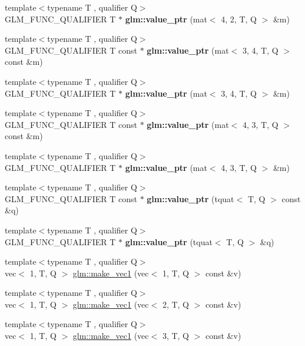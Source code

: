 \begin{DoxyCompactItemize}
\item 
{\footnotesize template$<$typename T , qualifier Q$>$ }\\G\+L\+M\+\_\+\+F\+U\+N\+C\+\_\+\+Q\+U\+A\+L\+I\+F\+I\+ER T $\ast$ {\bfseries glm\+::value\+\_\+ptr} (mat$<$ 4, 2, T, Q $>$ \&m)
\item 
{\footnotesize template$<$typename T , qualifier Q$>$ }\\G\+L\+M\+\_\+\+F\+U\+N\+C\+\_\+\+Q\+U\+A\+L\+I\+F\+I\+ER T const  $\ast$ {\bfseries glm\+::value\+\_\+ptr} (mat$<$ 3, 4, T, Q $>$ const \&m)
\item 
{\footnotesize template$<$typename T , qualifier Q$>$ }\\G\+L\+M\+\_\+\+F\+U\+N\+C\+\_\+\+Q\+U\+A\+L\+I\+F\+I\+ER T $\ast$ {\bfseries glm\+::value\+\_\+ptr} (mat$<$ 3, 4, T, Q $>$ \&m)
\item 
{\footnotesize template$<$typename T , qualifier Q$>$ }\\G\+L\+M\+\_\+\+F\+U\+N\+C\+\_\+\+Q\+U\+A\+L\+I\+F\+I\+ER T const  $\ast$ {\bfseries glm\+::value\+\_\+ptr} (mat$<$ 4, 3, T, Q $>$ const \&m)
\item 
{\footnotesize template$<$typename T , qualifier Q$>$ }\\G\+L\+M\+\_\+\+F\+U\+N\+C\+\_\+\+Q\+U\+A\+L\+I\+F\+I\+ER T $\ast$ {\bfseries glm\+::value\+\_\+ptr} (mat$<$ 4, 3, T, Q $>$ \&m)
\item 
{\footnotesize template$<$typename T , qualifier Q$>$ }\\G\+L\+M\+\_\+\+F\+U\+N\+C\+\_\+\+Q\+U\+A\+L\+I\+F\+I\+ER T const  $\ast$ {\bfseries glm\+::value\+\_\+ptr} (tquat$<$ T, Q $>$ const \&q)
\item 
{\footnotesize template$<$typename T , qualifier Q$>$ }\\G\+L\+M\+\_\+\+F\+U\+N\+C\+\_\+\+Q\+U\+A\+L\+I\+F\+I\+ER T $\ast$ {\bfseries glm\+::value\+\_\+ptr} (tquat$<$ T, Q $>$ \&q)
\item 
{\footnotesize template$<$typename T , qualifier Q$>$ }\\vec$<$ 1, T, Q $>$ \hyperlink{group__gtc__type__ptr_ga4135f03f3049f0a4eb76545c4967957c}{glm\+::make\+\_\+vec1} (vec$<$ 1, T, Q $>$ const \&v)
\item 
{\footnotesize template$<$typename T , qualifier Q$>$ }\\vec$<$ 1, T, Q $>$ \hyperlink{group__gtc__type__ptr_ga13c92b81e55f201b052a6404d57da220}{glm\+::make\+\_\+vec1} (vec$<$ 2, T, Q $>$ const \&v)
\item 
{\footnotesize template$<$typename T , qualifier Q$>$ }\\vec$<$ 1, T, Q $>$ \hyperlink{group__gtc__type__ptr_ga3c23cc74086d361e22bbd5e91a334e03}{glm\+::make\+\_\+vec1} (vec$<$ 3, T, Q $>$ const \&v)

\end{DoxyCompactItemize}

